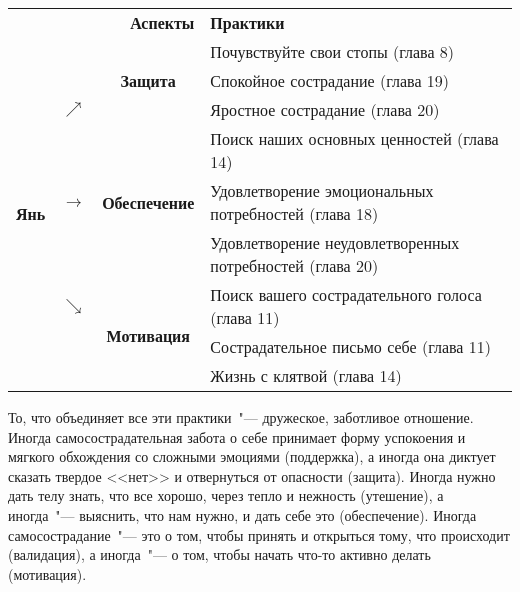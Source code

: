 \begin{table}[!h]
	\begin{center}
		\setlength{\extrarowheight}{1mm}
		\begin{tabular}{ccc||l}
			\multicolumn{3}{r||}{{\large\textbf{Аспекты}}} &{\large\textbf{Практики}}\\
			\cline{3-4}
			\multirow{9}{*}{{\huge\textbf{Янь}}} &  & \multirow{3}{*}{\textbf{Защита}} & Почувствуйте свои стопы (глава 8) \\ 
			&  &  & Спокойное сострадание (глава 19)\\ 
			& $\nearrow$ &  & Яростное сострадание (глава 20)\\ \cline{3-4}
			& \multirow{3}{*}{\textbf{$\rightarrow$}} & \multirow{3}{*}{\textbf{Обеспечение}} & Поиск наших основных ценностей (глава 14)\\
			&   &   & Удовлетворение эмоциональных потребностей (глава 18)\\
			&   &   & Удовлетворение неудовлетворенных потребностей (глава 20)\\ \cline{3-4}
			& $\searrow$ & \multirow{3}{*}{\textbf{Мотивация}} & Поиск вашего сострадательного голоса (глава 11)\\
			&   &   & Сострадательное письмо себе (глава 11)\\
			&   &   & Жизнь с клятвой (глава 14)\\ \cline{3-4}
		\end{tabular}
		\setlength{\extrarowheight}{0mm}
	\end{center}
\end{table} 

То, что объединяет все эти практики~"--- дружеское, заботливое отношение. Иногда самосострадательная забота о себе принимает форму успокоения и мягкого обхождения со сложными эмоциями (поддержка), а иногда она диктует сказать твердое <<нет>> и отвернуться от опасности (защита). Иногда нужно дать телу знать, что все хорошо, через тепло и нежность (утешение), а иногда~"--- выяснить, что нам нужно, и дать себе это (обеспечение). Иногда самосострадание~"--- это о том, чтобы принять и открыться тому, что происходит (валидация), а иногда~"--- о том, чтобы начать что-то активно делать (мотивация). 

